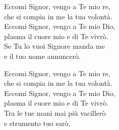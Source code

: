 
\strofa Eccomi Signor, vengo a Te mio re,\\
che si compia in me la tua volontà.\\
Eccomi Signor, vengo a Te mio Dio,\\
plasma il cuore mio e di Te vivrò.\\
Se Tu lo vuoi Signore manda me\\
e il tuo nome annuncerò.

\spazio


\spazio

\strofa Eccomi Signor, vengo a Te mio re,\\
che si compia in me la tua volontà.\\
Eccomi Signor, vengo a Te mio Dio,\\
plasma il cuore mio e di Te vivrò.\\
Tra le tue mani mai più vacillerò\\
e strumento tuo sarò.

\spazio

